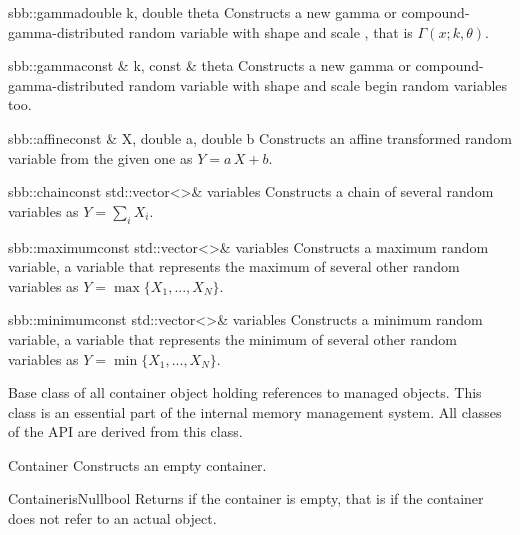 \documentclass[a4paper, 10pt]{paper}
\begin{document}
\begin{deffunc}{sbb::gamma}{}{double k, double theta}
Constructs a new gamma or compound-gamma-distributed random variable with shape  and 
scale  , that is $\Gamma(x; k, \theta)$.
\end{deffunc}

\begin{deffunc*}{sbb::gamma}{}{const \& k, const \& theta}
Constructs a new gamma or compound-gamma-distributed random variable with shape  and 
scale  begin random variables too.
\end{deffunc*}

\begin{deffunc}{sbb::affine}{}{const \& X, double a, double b}
Constructs an affine transformed random variable from the given one as $Y = a\,X+b$.
\end{deffunc}

\begin{deffunc}{sbb::chain}{}{const std::vector<>\& variables}
Constructs a chain of several random variables as $Y = \sum_i X_i$. 
\end{deffunc}

\begin{deffunc}{sbb::maximum}{}{const std::vector<>\& variables}
Constructs a maximum random variable, a variable that represents the maximum of several other random variables as $Y = \max\{X_1,...,X_N\}$.
\end{deffunc}

\begin{deffunc}{sbb::minimum}{}{const std::vector<>\& variables}
Constructs a minimum random variable, a variable that represents the minimum of several other random variables as $Y = \min\{X_1,...,X_N\}$.
\end{deffunc}


Base class of all container object holding references to managed objects. This class is an essential part of the internal memory 
management system. All classes of the API are derived from this class.

\begin{classsyn}{Container}{}
Constructs an empty container.
\end{classsyn}

\begin{defmeth}{Container}{isNull}{bool}{}
Returns  if the container is empty, that is if the container does not refer to an actual object.
\end{defmeth}
\end{document}

